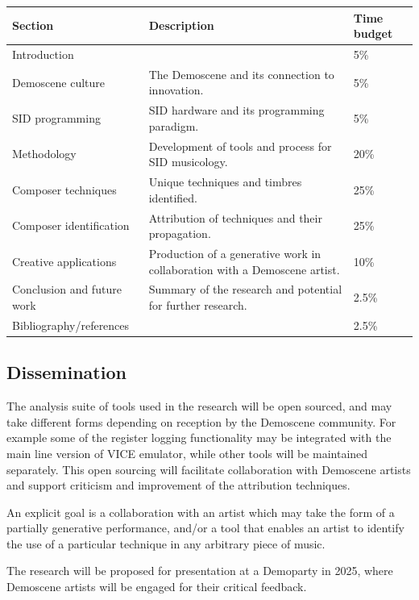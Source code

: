 \documentclass[10pt]{article}
\begin{document}
\begin{multicols*}{2}
  \begin{tabular}{|l|l|l|}
        \hline
        Section & Description & Time budget \\
        \hline
        Introduction &  & 5\% \\
        \hline
        Demoscene culture & The Demoscene and its connection to innovation. & 5\% \\
        \hline
        SID programming & SID hardware and its programming paradigm. & 5\% \\
        \hline
        Methodology & Development of tools and process for SID musicology. & 20\% \\
        \hline
        Composer techniques & Unique techniques and timbres identified. & 25\% \\
        \hline
        Composer identification & Attribution of techniques and their propagation. & 25\% \\
        \hline
        Creative applications & Production of a generative work in collaboration with a Demoscene artist.  & 10\% \\
        \hline
        Conclusion and future work & Summary of the research and potential for further research. & 2.5\% \\
        \hline
        Bibliography/references &  & 2.5\% \\
        \hline
  \end{tabular}

  \subsection{Dissemination}

  The analysis suite of tools used in the research will be open sourced, and may take different forms depending on reception by the Demoscene community. For example some of the register logging functionality may be integrated with the main line version of VICE emulator, while other tools will be maintained separately. This open sourcing will facilitate collaboration with Demoscene artists and support criticism and improvement of the attribution techniques.

  An explicit goal is a collaboration with an artist which may take the form of a partially generative performance, and/or a tool that enables an artist to identify the use of a particular technique in any arbitrary piece of music.

  The research will be proposed for presentation at a Demoparty in 2025, where Demoscene artists will be engaged for their critical feedback.


\end{multicols*}
\end{document}
